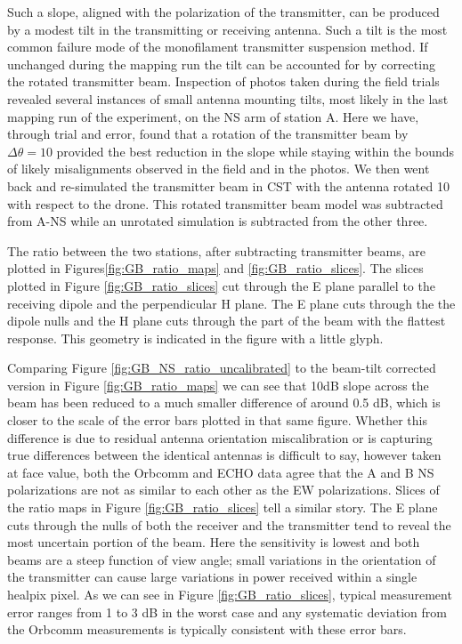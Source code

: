 \documentclass[preprint2,numberedappendix,tighten,twocolappendix]{aastex6}
\begin{document}
Such a slope, aligned with the polarization of the transmitter, can be produced by a modest tilt in the transmitting or receiving antenna. Such a tilt is the most common failure mode of the monofilament transmitter suspension method. If unchanged during the mapping run the tilt can be accounted for by correcting the rotated transmitter beam.  Inspection of photos taken during the field trials revealed several instances of small antenna mounting tilts, most likely in the last mapping run of the experiment, on the NS arm of station A. Here we have, through trial and error, found that a rotation of the transmitter beam by $\Delta \theta = 10$\arcdeg{} provided the best reduction in the slope while staying within the bounds of likely misalignments observed in the field and in the photos. We then went back and re-simulated the transmitter beam in CST with the antenna rotated 10\arcdeg{} with respect to the drone. This rotated transmitter beam model was subtracted from A-NS while an unrotated simulation is subtracted from the other three.

The ratio between the two stations, after subtracting transmitter beams, are plotted in Figures\ref{fig:GB_ratio_maps} and \ref{fig:GB_ratio_slices}.  The slices plotted in Figure \ref{fig:GB_ratio_slices} cut through the E plane parallel to the receiving dipole and the perpendicular H plane.  The E plane cuts through the the dipole nulls and the H plane cuts through the part of the beam with the flattest response.    This geometry is indicated in the figure with a little glyph.

Comparing Figure \ref{fig:GB_NS_ratio_uncalibrated} to the beam-tilt corrected version in Figure \ref{fig:GB_ratio_maps} we can see that 10dB slope across the beam has been reduced to a much smaller difference of around 0.5 dB, which is closer to the scale of the error bars plotted in that same figure. Whether this difference is due to residual antenna orientation miscalibration or is capturing true differences between the identical antennas is difficult to say, however taken at face value, both the Orbcomm and ECHO data agree that the A and B NS polarizations are not as similar to each other as the EW polarizations. Slices of the ratio maps in Figure \ref{fig:GB_ratio_slices} tell a similar story.  The E plane cuts through the nulls of both the receiver and the transmitter tend to reveal the most uncertain portion of the beam. Here the sensitivity is lowest and both beams are a steep function of view angle;  small variations in the orientation of the transmitter can cause large variations in power received within a single healpix pixel.  As we can see in Figure \ref{fig:GB_ratio_slices}, typical measurement error ranges from 1 to 3 dB in the worst case and any systematic deviation from the Orbcomm measurements is typically consistent with these error bars. 
\end{document}
